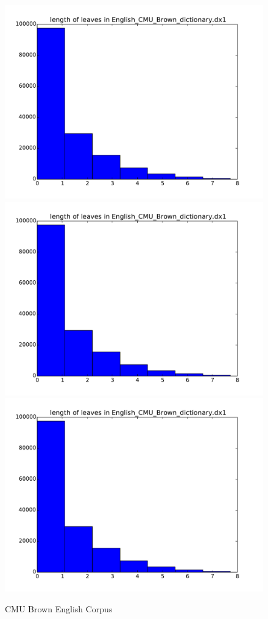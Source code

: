\documentclass{article}
\begin{document}
		\begin{figure}[H]
		\centering
		\caption{CMU Brown English Corpus}
		\includegraphics[scale=.5,page=1]{English_CMU_Brown_dictionary_dx1_histograms.pdf}
		\includegraphics[scale=.5,page=2]{English_CMU_Brown_dictionary_dx1_histograms.pdf}
		\includegraphics[scale=.5,page=3]{English_CMU_Brown_dictionary_dx1_histograms.pdf}
		\end{figure}
		
\end{document}
